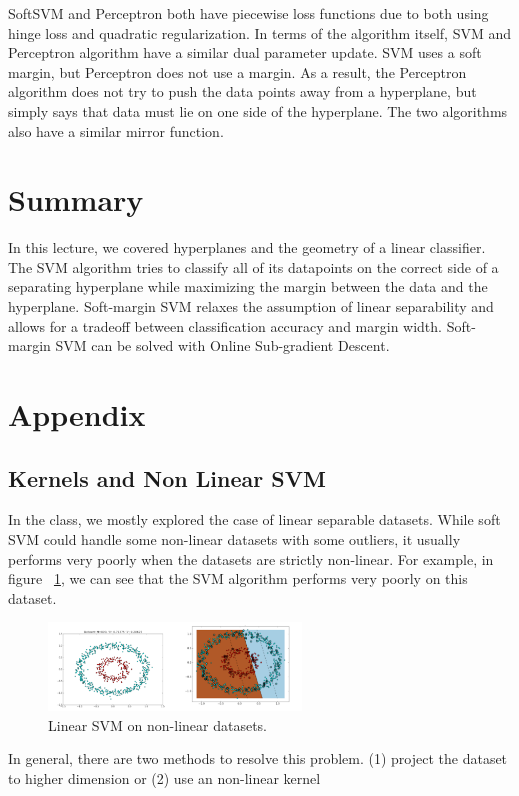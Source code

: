 \documentclass[11pt]{article}
\begin{document}
SoftSVM and Perceptron both have piecewise loss functions due to both using hinge loss and quadratic regularization. In terms of the algorithm itself, SVM and Perceptron algorithm have a similar dual parameter update. SVM uses a soft margin, but Perceptron does not use a margin. As a result, the Perceptron algorithm does not try to push the data points away from a hyperplane, but simply says that data must lie on one side of the hyperplane. The two algorithms also have a similar mirror function.


\section{Summary}
In this lecture, we covered hyperplanes and the geometry of a linear classifier. The SVM algorithm tries to classify all of its datapoints on the correct side of a separating hyperplane while maximizing the margin between the data and the hyperplane. Soft-margin SVM relaxes the assumption of linear separability and allows for a tradeoff between classification accuracy and margin width. Soft-margin SVM can be solved with Online Sub-gradient Descent.

\section{Appendix}
\subsection{Kernels and Non Linear SVM}
In the class, we mostly explored the case of linear separable datasets. While soft SVM could handle some non-linear datasets with some outliers, it usually performs very poorly when the datasets are strictly non-linear. For example, in figure ~\ref{fig:nonlinear}, we can see that the SVM algorithm performs very poorly on this dataset. 
\begin{figure}[H]
    \centering
    \includegraphics[width=0.6\textwidth]{images/nonlinear.png}
    \caption{Linear SVM on non-linear datasets.}
    \label{fig:nonlinear}
\end{figure}
In general, there are two methods to resolve this problem. (1) project the dataset to higher dimension or (2) use an non-linear kernel
\end{document}
